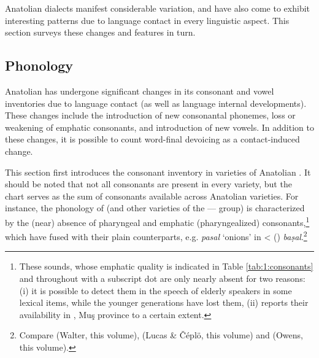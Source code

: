 \documentclass[output=paper]{langsci/langscibook}
\begin{document}
Anatolian  dialects manifest considerable variation, and have also come to exhibit interesting patterns due to language contact in every linguistic aspect. This section surveys these changes and features in turn.

\subsection{Phonology}

Anatolian  has undergone significant changes in its consonant and vowel inventories due to language contact (as well as language internal developments). These changes include the introduction of new consonantal phonemes, loss or weakening of {emphatic consonants}, and introduction of new vowels. In addition to these changes, it is possible to count word-final {devoicing} as a contact-induced change.

This section first introduces the consonant inventory in varieties of Anatolian . It should be noted that not all consonants are present in every variety, but the chart serves as the sum of consonants available across Anatolian  varieties. For instance, the phonology of   (and other varieties of the ---- group) is characterized by the (near) absence of {pharyngeal} and {emphatic} ({pharyngealized}) consonants,\footnote{These sounds, whose {emphatic} quality is indicated in Table \ref{tab:1:consonants} and throughout with a subscript dot are only nearly absent for two reasons: (i) it is possible to detect them in the speech of elderly speakers in some lexical items, while the younger generations have lost them, (ii) \cite{Talay2001} reports their availability in , Muş province to a certain extent.} which have fused with their plain counterparts, e.g. \textit{pasal} `onions' in
 <  () \textit{baṣal}.\footnote{Compare   (Walter, this volume),  (Lucas \& Čéplö, this volume) and   (Owens, this volume).}
\end{document}
